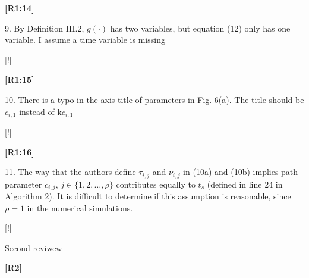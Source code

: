 \documentclass[10pt]{letter}
\begin{document}
{\hspace*{-4.5em}\textbf{[R1:14]}\vspace*{-1.9em}}

9. By Definition III.2, $g(\cdot)$ has two variables, but equation (12) only has one variable. I assume a time variable is missing

{\color{blue} 

{\hspace*{-4.5em}{[R1:14]}\vspace*{-1.9em}}

[!]}

{\hspace*{-4.5em}\textbf{[R1:15]}\vspace*{-1.9em}}

10. There is a typo in the axis title of parameters in Fig. 6(a). The title should be $c_{i,1}$ instead of k$c_{i,1}$

{\color{blue} 

{\hspace*{-4.5em}{[R1:15]}\vspace*{-1.9em}}

[!]}

{\hspace*{-4.5em}\textbf{[R1:16]}\vspace*{-1.9em}}

11. The way that the authors define $\tau_{i,j}$ and $\nu_{i,j}$ in (10a) and (10b) implies path parameter $c_{i,j}$, $j\in\{1,2,\dots,\rho\}$ contributes equally to $t_s$ (defined in line 24 in Algorithm 2). It is difficult to determine if this assumption is reasonable, since $\rho=1$ in the numerical simulations.

{\color{blue} 

{\hspace*{-4.5em}{[R1:16]}\vspace*{-1.9em}}

[!]}













\newpage

{Second reviwew}

\vspace{3em}

{\hspace*{-4.5em}\textbf{[R2]}\vspace*{-1.9em}}
\end{document}
